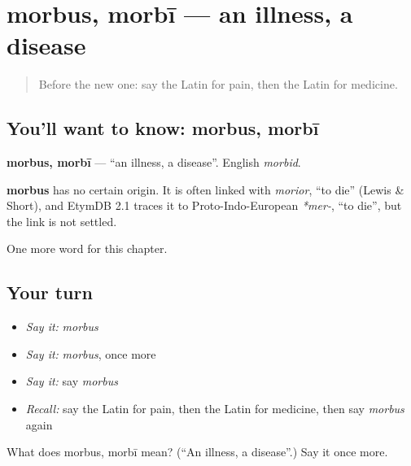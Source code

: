 \section[morbus, morbī]{morbus, morbī — an illness, a disease}

\label{lesson:LA-C67-morbus}



\begin{quote}
Before the new one: say the Latin for pain, then the Latin for medicine.
\end{quote}

\subsection*{You'll want to know: morbus, morbī}
\textbf{morbus, morbī} — \textquotedblleft{}an illness, a disease\textquotedblright{}. English \emph{morbid}.

\begin{cousinweb}
\textbf{morbus} has no certain origin. It is often linked with \emph{morior}, \textquotedblleft{}to die\textquotedblright{} (Lewis \& Short), and EtymDB 2.1 traces it to Proto-Indo-European \emph{*mer-}, \textquotedblleft{}to die\textquotedblright{}, but the link is not settled.
\end{cousinweb}

\begin{grammarlens}[title={What you've built}]
One more word for this chapter.
\end{grammarlens}

\subsection*{Your turn}
\begin{itemize}
\raggedright
  \item \emph{Say it:} \emph{morbus}
  \item \emph{Say it:} \emph{morbus}, once more
  \item \emph{Say it:} say \emph{morbus}
  \item \emph{Recall:} say the Latin for pain, then the Latin for medicine, then say \emph{morbus} again
\end{itemize}

\begin{tcolorbox}[breakable,colback=teal!4,colframe=teal!35!black,title={Before you move on}]
What does morbus, morbī mean? (\textquotedblleft{}An illness, a disease\textquotedblright{}.) Say it once more.
\end{tcolorbox}
